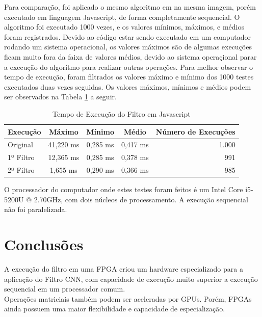 \documentclass[12pt]{article}
\begin{document}
Para comparação, foi aplicado o mesmo algoritmo em na mesma imagem, porém executado em linguagem
Javascript, de forma completamente sequencial. O algoritmo foi executado 1000 vezes, e os
valores mínimos, máximos, e médios foram registrados. Devido ao código estar sendo executado
em um computador rodando um sistema operacional, os valores máximos são de algumas execuções
ficam muito fora da faixa de valores médios, devido ao sistema operaçional parar a execução
do algoritmo para realizar outras operações. Para melhor observar o tempo de execução, foram
filtrados os valores máximo e mínimo dos 1000 testes executados duas vezes seguidas.
Os valores máximos, mínimos e médios podem ser observados na Tabela \ref{tab:comp_to_sequ}
a seguir.\\

\begin{table}[h]
	\centering
	\caption{Tempo de Execução do Filtro em Javascript}
	\begin{tabular}{|l|c|c|c|r|}
		\hline
		Execução	& Máximo	& Mínimo	& Médio		& Número de Execuções \\
		\hline
		Original	& 41,220 ms	& 0,285 ms	& 0,417 ms	& 1.000 \\
		1º Filtro	& 12,365 ms	& 0,285 ms	& 0,378 ms	& 991 \\
		2º Filtro	& 1,655 ms	& 0,290 ms	& 0,366 ms	& 985 \\
		\hline
	\end{tabular}
	\label{tab:comp_to_sequ}
\end{table}

O processador do computador onde estes testes foram feitos é um Intel Core i5-5200U @ 2.70GHz,
com dois núcleos de processamento. A execução sequencial não foi paralelizada.\\

\section{Conclusões}

A execução do filtro em uma FPGA criou um hardware especializado para a aplicação do Filtro CNN,
com capacidade de execução muito superior a execução sequencial em um processador comum.\\

Operações matriciais também podem ser aceleradas por GPUs. Porém, FPGAs ainda possuem uma maior
flexibilidade e capacidade de especialização.
\end{document}
